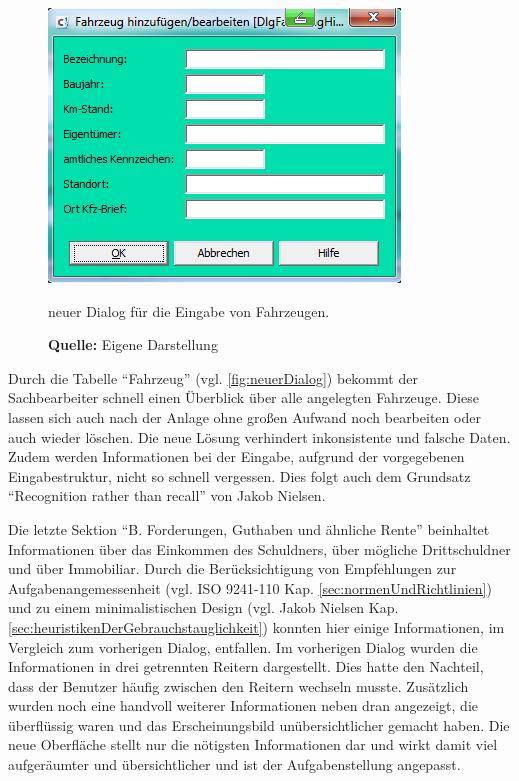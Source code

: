 \begin{figure}[H]
  \centering
  \includegraphics[scale=0.9]{img/FahrzeugAnlegenBearbeiten_Dialog.PNG}
  \caption{neuer Dialog für die Eingabe von Fahrzeugen.}
    \caption*{\textbf{Quelle:} Eigene Darstellung}
  \label{fig:fahrzeugAnlegenBearbeitenDialog}
\end{figure}
Durch die Tabelle \enquote{Fahrzeug} (vgl. \ref{fig:neuerDialog}) bekommt der Sachbearbeiter schnell einen Überblick über alle angelegten Fahrzeuge. Diese lassen sich auch nach der Anlage ohne großen Aufwand noch bearbeiten oder auch wieder löschen. Die neue Lösung verhindert inkonsistente und falsche Daten. Zudem werden Informationen bei der Eingabe, aufgrund der vorgegebenen Eingabestruktur, nicht so schnell vergessen. Dies folgt auch dem Grundsatz \enquote{Recognition rather than recall} von Jakob Nielsen.

Die letzte Sektion \enquote{B. Forderungen, Guthaben und ähnliche Rente} beinhaltet Informationen über das Einkommen des Schuldners, über mögliche Drittschuldner und über Immobiliar. Durch die Berücksichtigung von Empfehlungen zur Aufgabenangemessenheit (vgl. ISO 9241-110 Kap. \ref{sec:normenUndRichtlinien}) und zu einem minimalistischen Design (vgl. Jakob Nielsen Kap. \ref{sec:heuristikenDerGebrauchstauglichkeit}) konnten hier einige Informationen, im Vergleich zum vorherigen Dialog, entfallen. Im vorherigen Dialog wurden die Informationen in drei getrennten Reitern dargestellt. Dies hatte den Nachteil, dass der Benutzer häufig zwischen den Reitern wechseln musste. Zusätzlich wurden noch eine handvoll weiterer Informationen neben dran angezeigt, die überflüssig waren und das Erscheinungsbild unübersichtlicher gemacht haben. Die neue Oberfläche stellt nur die nötigsten Informationen dar und wirkt damit viel aufgeräumter und übersichtlicher und ist der Aufgabenstellung angepasst.

